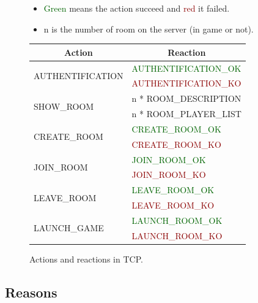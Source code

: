 \documentclass[a4 paper, 12pt]{report}
\newcommand{\actionsuccess}[1]{\textcolor{DarkGreen}{#1}}
\newcommand{\actionfailure}[1]{\textcolor{DarkRed}{#1}}
\begin{document}
\begin{figure}[!Hh]
  \begin{itemize}
  \item \actionsuccess{Green} means the action succeed and \actionfailure{red} it failed.
  \item n is the number of room on the server (in game or not).
\end{itemize}

\centering
  \begin{tabular}{|l|l|}
    \hline
    \multicolumn{1}{|c|}{\textbf{Action}} & \multicolumn{1}{c|}{\textbf{Reaction}}\\
    \hline
    \hline
    \multirow{2}{*}{AUTHENTIFICATION} & \actionsuccess{AUTHENTIFICATION\_OK}\\
    & \actionfailure{AUTHENTIFICATION\_KO}\\
    \hline
    \multirow{2}{*}{SHOW\_ROOM} & n * ROOM\_DESCRIPTION\\
    & n * ROOM\_PLAYER\_LIST\\
    \hline
    \multirow{2}{*}{CREATE\_ROOM} & \actionsuccess{CREATE\_ROOM\_OK}\\
    & \actionfailure{CREATE\_ROOM\_KO}\\
    \hline
    \multirow{2}{*}{JOIN\_ROOM} & \actionsuccess{JOIN\_ROOM\_OK}\\
    & \actionfailure{JOIN\_ROOM\_KO}\\
    \hline
    \multirow{2}{*}{LEAVE\_ROOM} & \actionsuccess{LEAVE\_ROOM\_OK}\\
    & \actionfailure{LEAVE\_ROOM\_KO}\\
    \hline
    \multirow{2}{*}{LAUNCH\_GAME} & \actionsuccess{LAUNCH\_ROOM\_OK}\\
    & \actionfailure{LAUNCH\_ROOM\_KO}\\
    \hline
  \end{tabular}
  \caption{Actions and reactions in TCP.}
\end{figure}

\subsection{Reasons}
\end{document}

